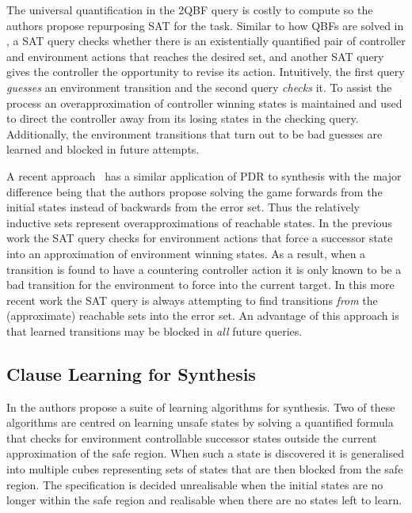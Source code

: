 The universal quantification in the 2QBF query is costly to compute so the authors propose repurposing SAT for the task. Similar to how QBFs are solved in \cite{Janota12}, a SAT query checks whether there is an existentially quantified pair of controller and environment actions that reaches the desired set, and another SAT query gives the controller the opportunity to revise its action. Intuitively, the first query \emph{guesses} an environment transition and the second query \emph{checks} it. To assist the process an overapproximation of controller winning states is maintained and used to direct the controller away from its losing states in the checking query. Additionally, the environment transitions that turn out to be bad guesses are learned and blocked in future attempts.

A recent approach~\cite{Chiang15} has a similar application of PDR to synthesis with the major difference being that the authors propose solving the game forwards from the initial states instead of backwards from the error set. Thus the relatively inductive sets represent overapproximations of reachable states. In the previous work the SAT query checks for environment actions that force a successor state into an approximation of environment winning states. As a result, when a transition is found to have a countering controller action it is only known to be a bad transition for the environment to force into the current target. In this more recent work the SAT query is always attempting to find transitions \emph{from} the (approximate) reachable sets into the error set. An advantage of this approach is that learned transitions may be blocked in \emph{all} future queries.

\subsection{Clause Learning for Synthesis}

In \cite{Bloem14} the authors propose a suite of learning algorithms for synthesis. Two of these algorithms are centred on learning unsafe states by solving a quantified formula that checks for environment controllable successor states outside the current approximation of the safe region. When such a state is discovered it is generalised into multiple cubes representing sets of states that are then blocked from the safe region. The specification is decided unrealisable when the initial states are no longer within the safe region and realisable when there are no states left to learn. 

